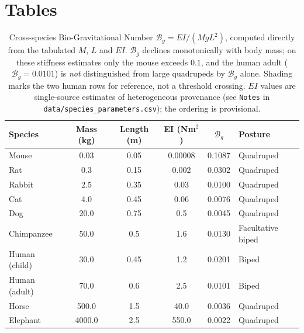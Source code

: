 \section*{Tables}

\begin{table}[h!]
\centering
\caption{Cross-species Bio-Gravitational Number $\mathcal{B}_g = EI/(MgL^2)$, computed directly from the tabulated $M$, $L$ and $EI$. $\mathcal{B}_g$ declines monotonically with body mass; on these stiffness estimates only the mouse exceeds $0.1$, and the human adult ($\mathcal{B}_g = 0.0101$) is \emph{not} distinguished from large quadrupeds by $\mathcal{B}_g$ alone. Shading marks the two human rows for reference, not a threshold crossing. $EI$ values are single-source estimates of heterogeneous provenance (see \texttt{Notes} in \texttt{data/species\_parameters.csv}); the ordering is provisional.}
\label{tab:cross_species}
\small
\begin{tabular}{lccccl}
\toprule
\textbf{Species} & \textbf{Mass (kg)} & \textbf{Length (m)} & \textbf{EI (Nm$^2$)} & \textbf{$\mathcal{B}_g$} & \textbf{Posture} \\
\midrule
Mouse & 0.03 & 0.05 & 0.00008 & 0.1087 & Quadruped \\
Rat & 0.3 & 0.15 & 0.002 & 0.0302 & Quadruped \\
Rabbit & 2.5 & 0.35 & 0.03 & 0.0100 & Quadruped \\
Cat & 4.0 & 0.45 & 0.06 & 0.0076 & Quadruped \\
Dog & 20.0 & 0.75 & 0.5 & 0.0045 & Quadruped \\
Chimpanzee & 50.0 & 0.5 & 1.6 & 0.0130 & Facultative biped \\
\rowcolor{yellow!15} Human (child) & 30.0 & 0.45 & 1.2 & 0.0201 & Biped \\
\rowcolor{yellow!15} Human (adult) & 70.0 & 0.6 & 2.5 & 0.0101 & Biped \\
Horse & 500.0 & 1.5 & 40.0 & 0.0036 & Quadruped \\
Elephant & 4000.0 & 2.5 & 550.0 & 0.0022 & Quadruped \\
\bottomrule
\end{tabular}
\end{table}


